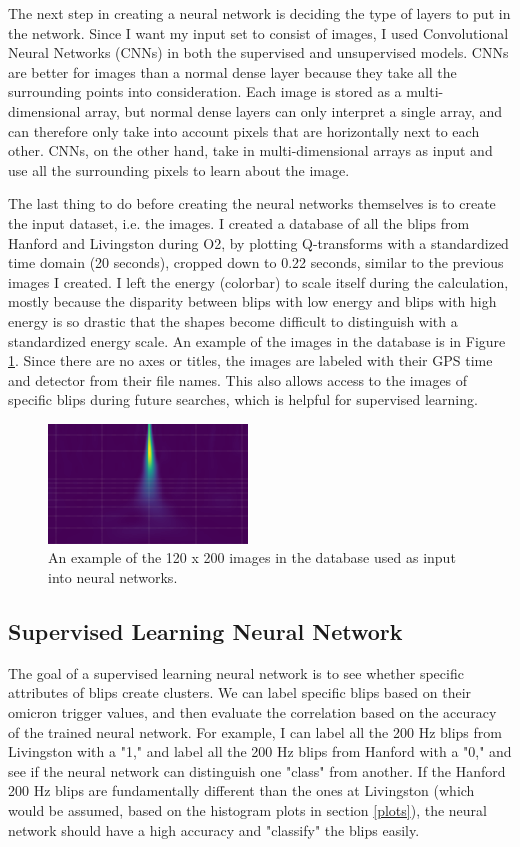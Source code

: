 \documentclass[a4paper]{article}
\begin{document}
The next step in creating a neural network is deciding the type of layers to put in the network. Since I want my input set to consist of images, I used Convolutional Neural Networks (CNNs) in both the supervised and unsupervised models. CNNs are better for images than a normal dense layer because they take all the surrounding points into consideration. Each image is stored as a multi-dimensional array, but normal dense layers can only interpret a single array, and can therefore only take into account pixels that are horizontally next to each other. CNNs, on the other hand, take in multi-dimensional arrays as input and use all the surrounding pixels to learn about the image. 

The last thing to do before creating the neural networks themselves is to create the input dataset, i.e. the images. I created a database of all the blips from Hanford and Livingston during O2, by plotting Q-transforms with a standardized time domain (20 seconds), cropped down to 0.22 seconds, similar to the previous images I created. I left the energy (colorbar) to scale itself during the calculation, mostly because the disparity between blips with low energy and blips with high energy is so drastic that the shapes become difficult to distinguish with a standardized energy scale. An example of the images in the database is in Figure \ref{fig:image}. Since there are no axes or titles, the images are labeled with their GPS time and detector from their file names. This also allows access to the images of specific blips during future searches, which is helpful for supervised learning.

\begin{figure}[h!]
	\centering
	\includegraphics[width=.4\linewidth]{image}
	\caption{An example of the 120 x 200 images in the database used as input into neural networks.}
	\label{fig:image}
\end{figure}

\subsection{Supervised Learning Neural Network}

The goal of a supervised learning neural network is to see whether specific attributes of blips create clusters. We can label specific blips based on their omicron trigger values, and then evaluate the correlation based on the accuracy of the trained neural network. For example, I can label all the 200 Hz blips from Livingston with a "1," and label all the 200 Hz blips from Hanford with a "0," and see if the neural network can distinguish one "class" from another. If the Hanford 200 Hz blips are fundamentally different than the ones at Livingston (which would be assumed, based on the histogram plots in section \ref{plots}), the neural network should have a high accuracy and "classify" the blips easily.
\end{document}
